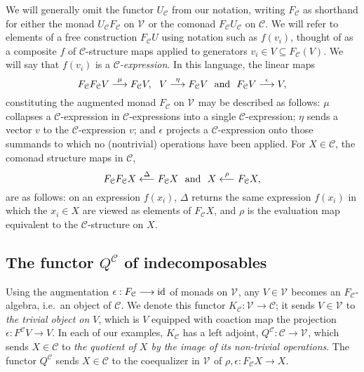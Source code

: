 \documentclass[11pt]{amsart}
\theoremstyle{plain}
\theoremstyle{definition}
\renewcommand{\to}{\longrightarrow}
\newcommand{\from}{\longleftarrow}
\newcommand{\calC}{\mathcal{C}}
\newcommand{\calV}{\mathcal{V}}
\newcommand{\calc}{\mathcal{C}}
\theoremstyle{plain}
\newcommand{\vect}[2]{\calV^{#1}_{#2}}
\newcommand{\Id}{\textup{id}}
\begin{document}
\begin{Conventions and notation}
We will generally omit the functor $U_{\calC}$ from our notation, writing $F_{\calC}$ as shorthand for either the monad $U_{\calC}F_{\calC}$ on $\vect{}{}$ or the comonad $F_{\calC}U_{\calC}$ on $\calC$. We will refer to elements of a free construction $F_\calC U$ using notation such as $f(v_i)$, thought of as a composite $f$ of $\calC$-structure maps applied to generators $v_i\in V\subseteq F_\calC(V)$. We will say that $f(v_i)$ is a \emph{$\calC$-expression}. In this language, the linear maps %
\[F_{\calc}F_{\calc}V\overset{\mu}{\to} F_{\calc}V,\ \ V\overset{\eta}{\to}F_{\calc}V\ \ \textup{and}\ \ F_{\calc}V\overset{\epsilon}{\to}V, \]
constituting the augmented monad $F_{\calc}$ on $\vect{}{}$ may be described as follows: $\mu$ collapses a $\calc$-expression  in $\calc$-expressions into a single $\calc$-expression; $\eta$ sends a vector $v$ to the $\calc$-expression $v$; and $\epsilon$ projects a $\calc$-expression onto those summands to which no (nontrivial) operations have been applied.
For $X\in \calc$, the comonad structure maps in $\calc$,
\[F_{\calc}F_{\calc}X\overset{\Delta}{\from} F_{\calc}X\ \ \textup{and}\ \ X\overset{\rho}{\from}F_{\calc}X,\]
are as follows: on an expression $f(x_i)$, $\Delta$ returns the same expression $f(x_i)$ in which the $x_i\in X$ are viewed as elements of $F_{\calc}X$, and $\rho$ is the evaluation map equivalent to the $\calc$-structure on $X$.

\subsection{The functor $Q^\calc$ of indecomposables}
Using the augmentation $\epsilon:F_\calc\to\Id$ of monads on $\vect{}{}$, any $V\in\vect{}{}$ becomes an $F_{\calc}$-algebra, i.e.\ an object of $\calc$. We denote this functor $K_\calC:\vect{}{}\to \calC$; it sends $V\in\vect{}{}$ to \emph{the trivial object on $V$}, which is $V$ equipped with coaction map the projection $\epsilon:F^{\calC}V\to V$. In each of our examples,  $K_{\calC}$ has a left adjoint, $Q^{\calC}:\calC\to\vect{}{}$, which sends $X\in\calC$ to \emph{the quotient of $X$ by the image of its non-trivial operations}. %
The functor $Q^{\calC}$ sends $X\in \calC$ to the coequalizer in $\vect{}{}$ of $\rho,\epsilon:F_{\calc}X\to X$.


\end{Conventions and notation}
\end{document}
